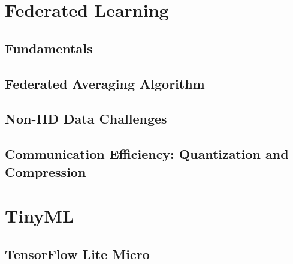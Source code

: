 \documentclass[12pt, a4paper, twoside, openright]{report}
\begin{document}
\section{Federated Learning}
\label{sec:fl-theory}

\subsection{Fundamentals}

\subsection{Federated Averaging Algorithm}
\begin{algorithm}[H]
  \caption{\gls{fedavg}~\cite{mcmahan2017communication}}
  \label{alg:fedavg}
\end{algorithm}

\subsection{Non-IID Data Challenges}

\subsection{Communication Efficiency: Quantization and Compression}

\section{TinyML}
\label{sec:tinyml-theory}

\subsection{TensorFlow Lite Micro}
\end{document}
